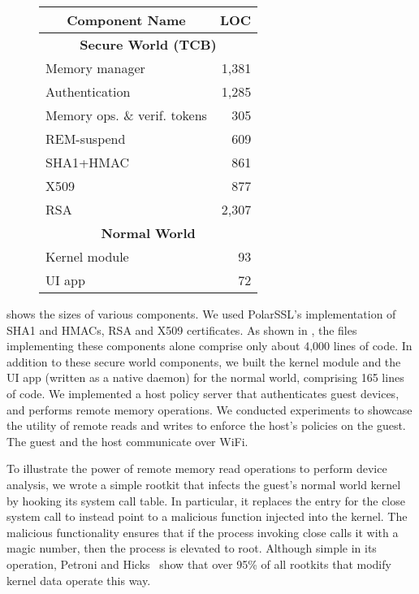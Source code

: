 \begin{figure}[t!]
\footnotesize
\renewcommand{\arraystretch}{0.5}
\centering
\begin{tabular}{|l|r|}
\hline
\multicolumn{1}{|c|}{\bf Component Name} & \multicolumn{1}{|c|}{\bf LOC}\\
\hline
\hline
\multicolumn{2}{|c|}{\bf Secure World (TCB)}\\
\hline
Memory manager                  & 1,381\\
Authentication                  & 1,285\\
Memory ops. \& verif. tokens    & 305\\
REM-suspend                     & 609\\
\hline
SHA1+HMAC                       & 861\\
X509                            & 877\\
RSA                             & 2,307\\
\hline
\hline
\multicolumn{2}{|c|}{\bf Normal World}\\
\hline
Kernel module                   & 93\\
UI app                          & 72\\
\hline
\end{tabular}
\indent\vspace{-0.1cm}
{\label{table:loc}}
\end{figure}
%

 shows the sizes of various components.  We used PolarSSL's
implementation of SHA1 and HMACs, RSA and X509 certificates.  As shown in
, the files implementing these components alone comprise only
about 4,000 lines of code. In addition to these secure world components, we
built the kernel module and the UI app (written as a native daemon) for the
normal world, comprising 165 lines of code.  We implemented a host policy
server that authenticates guest devices, and performs remote memory operations.
We conducted experiments to showcase the utility of remote reads and writes to
enforce the host's policies on the guest. The guest and the host communicate
over WiFi.
%

%
To illustrate the power of remote memory read operations to perform device
analysis, we wrote a simple rootkit that infects the guest's normal world
kernel by hooking its system call table. In particular, it replaces the entry
for the \textsf{close} system call to instead point to a malicious function
injected into the kernel. The malicious functionality ensures that if the
process invoking \textsf{close} calls it with a magic number, then the process
is elevated to \textsf{root}.  Although simple in its operation, Petroni and
Hicks~\cite{sbcfi:ccs07} show that over 95\% of all rootkits that modify kernel
data operate this way.

